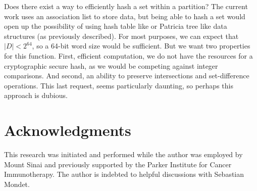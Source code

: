 \documentclass{article}
\begin{document}
Does there exist a way to efficiently hash a set within a partition?
The current work uses an association list to store data, but being able to
hash a set would open up the possibility of using hash table like
or Patricia tree like data structures (as previously
described\cite{Okasaki1998}).
For most purposes,
we can expect that $|D|<2^{64}$,
so a 64-bit word size would be sufficient.
But we want two properties for this function.
First, efficient computation,
we do not have the resources for a cryptographic secure hash,
as we would be competing against integer comparisons.
And second,
an ability to preserve intersections and set-difference operations.
This last request,
seems particularly daunting,
so perhaps this approach is dubious.

\section{Acknowledgments}

This research was initiated and performed while the author was employed by
Mount Sinai and previously supported by the Parker Institute for Cancer
Immunotherapy.
The author is indebted to helpful discussions with Sebastian Mondet.

\clearpage



\end{document}
